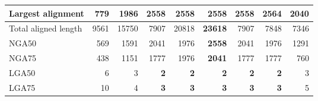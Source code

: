 \documentclass[12pt,a4paper]{article}
\begin{document}
\begin{table}[ht]
\begin{center}
\begin{tabular}{|l*{8}{|r}|}
Largest alignment & 779 & 1986 & 2558 & 2558 & 2558 & 2558 & {\bf 2564} & 2040 \\ \hline
Total aligned length & 9561 & 15750 & 7907 & 20818 & {\bf 23618} & 7907 & 7848 & 7346 \\ \hline
NGA50 & 569 & 1591 & 2041 & 1976 & {\bf 2558} & 2041 & 1976 & 1291 \\ \hline
NGA75 & 438 & 1151 & 1777 & 1976 & {\bf 2041} & 1777 & 1777 & 760 \\ \hline
LGA50 & 6 & 3 & {\bf 2} & {\bf 2} & {\bf 2} & {\bf 2} & {\bf 2} & 3 \\ \hline
LGA75 & 10 & 4 & {\bf 3} & {\bf 3} & {\bf 3} & {\bf 3} & {\bf 3} & 5 \\ \hline
\end{tabular}
\end{center}
\end{table}
\end{document}
